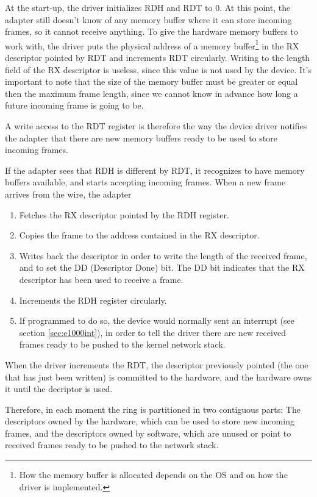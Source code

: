 \vspace{0.5cm}

At the start-up, the driver initializes RDH and RDT to 0. At this point, the adapter still doesn't know of any memory buffer where it
can store incoming frames, so it cannot receive anything.
To give the hardware memory buffers to work with, the driver puts the physical address of a memory buffer\footnote{How the memory 
buffer is allocated depends on the OS and on how the driver is implemented.} in the RX descriptor pointed by RDT and increments 
RDT circularly. Writing to the length field of the RX descriptor is useless, since this value is not used by the device. It's important to
note that the size of the memory buffer must be greater or equal then the maximum frame length, since we cannot know in advance how long
a future incoming frame is going to be.

A write access to the RDT register is therefore the way the device driver notifies the adapter that there are new memory buffers ready
to be used to store incoming frames.

If the adapter sees that RDH is different by RDT, it recognizes to have memory buffers available, and starts accepting incoming frames.
When a new frame arrives from the wire, the adapter
\begin{enumerate}
    \item Fetches the RX descriptor pointed by the RDH register.
    \item Copies the frame to the address contained in the RX descriptor.
    \item Writes back the descriptor in order to write the length of the received frame, and to set the DD (Descriptor Done) bit.
	  The DD bit indicates that the RX descriptor has been used to receive a frame.
    \item Increments the RDH register circularly.
    \item If programmed to do so, the device would normally sent an interrupt (see section \ref{sec:e1000int}), in order to tell
the driver there are new received frames ready to be pushed to the kernel network stack.
\end{enumerate}

When the driver increments the RDT, the descriptor previously pointed (the one that has just been written) is committed to the hardware,
and the hardware owns it until the decriptor is used.

Therefore, in each moment the ring is partitioned in two contiguous parts: The descriptors owned by the hardware, which can be
used to store new incoming frames, and the descriptors owned by software, which are unused or point to received frames ready to
be pushed to the network stack.

